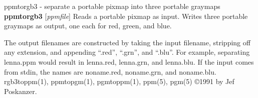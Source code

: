 \newpage
%

ppmtorgb3 - separate a portable pixmap into three portable graymaps
{\bf ppmtorgb3}
{\rm [}{\it ppmfile}{\rm ]}
Reads a portable pixmap as input.
Writes three portable graymaps as output, one each for red, green, and blue.
\par
The output filenames are constructed by taking the input filename,
stripping off any extension, and appending ``.red'', ``.grn'', and
``.blu''.
For example, separating lenna.ppm would result in lenna.red, lenna.grn,
and lenna.blu.
If the input comes from stdin, the names are noname.red, noname.grn,
and noname.blu.
rgb3toppm(1), ppmtopgm(1), pgmtoppm(1), ppm(5), pgm(5)
\copyright 1991 by Jef Poskanzer.
%
 
%

\newpage
%


